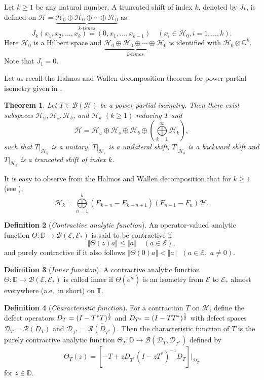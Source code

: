 \documentclass[12pt]{amsart}
\newcommand{\clb}{\mathcal{B}}
\newcommand{\cld}{\mathcal{D}}
\newcommand{\cle}{\mathcal{E}}
\newcommand{\clh}{\mathcal{H}}
\newcommand{\clr}{\mathcal{R}}
\newcommand{\NI}{\noindent}
\newcommand{\C}{\mathbb{C}}
\newcommand{\D}{\mathbb{D}}
\newcommand{\T}{\mathbb{T}}
\newcommand{\E}{\mathcal{E}}
\theoremstyle{definition}
\theoremstyle{plain}
\newtheorem{thm}{Theorem}[section]
\theoremstyle{definition}
\newtheorem{defn}[thm]{Definition}
\numberwithin{equation}{section}
\begin{document}
\NI
Let $k \geq 1$ be any natural number. A truncated shift of index $k$, denoted by $J_k$, is defined on $\mathcal{H}=\underbrace{\clh_0 \oplus\clh_0 \oplus \cdots \oplus\clh_0}_{k\text{-}times}$ as
\[
J_k(x_1,x_2, \ldots, x_k)=(0, x_1, \ldots, x_{k-1}) \quad (x_i \in \clh_0, i =1, \ldots, k).
\]
Here $\clh_0$ is a Hilbert space and $\underbrace{\clh_0 \oplus\clh_0 \oplus \cdots \oplus\clh_0}_{k\text{-} times}$ is identified with $\clh_0 \otimes \C^k$. Note that $J_1=0$.

Let us recall the Halmos and Wallen decomposition theorem for power partial isometry given in \cite{halmospowers}.

\begin{thm}
Let $T \in \clb(\clh)$  be a power partial isometry. Then there exist subspaces $\clh_u, \clh_s, \clh_b$, and $\clh_k\,\, (k \geq 1)$ reducing $T$   and 
\[
\clh= \clh_u \oplus\clh_s \oplus \clh_b \oplus \left(\bigoplus\limits _{k=1}	^\infty \clh_k\right),
\]
such that $T|_{\clh_u}$ is a unitary, $T|_{\clh_s}$ is a unilateral shift, $T|_{\clh_b}$ is a backward shift and $T|_{\clh_k}$ is a truncated shift of index $k$. 
\end{thm}
It is easy to observe from the Halmos and Wallen decomposition that for $k \geq 1$ (see \cite{BA}),
\[
\clh_k= \bigoplus\limits_{n=1}^k\left(E_{k-n}-E_{k-n+1}\right)\left(F_{n-1}-F_n\right)\clh.
\]

\begin{defn}[{\it Contractive analytic function}]
An operator-valued analytic function  $\Theta : \D \rightarrow \clb(\E,\E_*)$ is said to be contractive if 
$$\Vert \Theta( z)a \Vert\leq\Vert a \Vert \quad (a \in \E),$$
and purely contractive if it also follows $\Vert  \Theta(0) a \Vert < \Vert a \Vert\,\,  \,\, (a \in \cle,\,\, a \neq 0)$.
\end{defn}

\begin{defn}[{\it Inner function}]
A contractive analytic function $\Theta : \D \rightarrow \clb(\E,\E_*)$ is called inner if $\Theta(e^{it})$ is an isometry from $\cle$ to $\cle_*$ almost everywhere (a.e.\ in short) on $\T$.
\end{defn}


\begin{defn}[{\it Characteristic function}]
For a contraction $T$ on $\clh$, define the defect operators $D_T=(I-T^*T)^{{1}\over{2}}$ and $ D_{T^*}=(I-TT^*)^{{1}\over{2}}$  with defect spaces $\cld_T=\overline{\clr(D_T)}$ and $\cld_{T^*}=\overline{\clr(D_{T^*})}$. Then the characteristic function of $T$ is the purely contractive analytic function $\Theta_T: \D \rightarrow \clb(\cld_T,\cld_{T^*})$ defined by 
\[
\Theta_T( z)=\left[-T+ z D_{T^*}(I- z T^*)^{-1}D_T\right]\big|_{\cld_T}
\]
for $ z \in \D$.
\end{defn}
\end{document}
